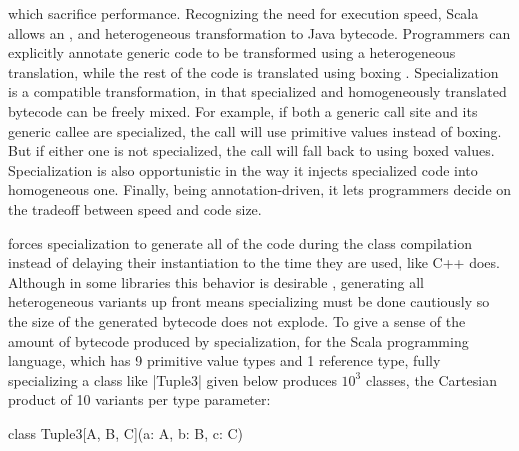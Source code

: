  which sacrifice performance. Recognizing the need for execution speed, Scala  \cite{iuli-thesis} allows an ,  and  heterogeneous transformation to Java bytecode. Programmers can explicitly annotate generic code to be transformed using a heterogeneous translation, while the rest of the code is translated using boxing \cite{java-erasure}. Specialization is a compatible transformation, in that specialized and homogeneously translated bytecode can be freely mixed. For example, if both a generic call site and its generic callee are specialized, the call will use primitive values instead of boxing. But if either one is not specialized, the call will fall back to using boxed values. Specialization is also opportunistic in the way it injects specialized code into homogeneous one. Finally, being annotation-driven, it lets programmers decide on the tradeoff between speed and code size.

 forces specialization to generate all  of the code during the class compilation instead of delaying their instantiation to the time they are used, like C++ does. Although in some libraries this behavior is desirable \cite{gil-adobe}, generating all heterogeneous variants up front means specializing must be done cautiously so the size of the generated bytecode does not explode. To give a sense of the amount of bytecode produced by specialization, for the Scala programming language, which has 9 primitive value types and 1 reference type, fully specializing a class like |Tuple3| given below produces $10^3$ classes, the Cartesian product of 10 variants per type parameter:

\begin{lstlisting-nobreak}
 class Tuple3[A, B, C](a: A, b: B, c: C)
\end{lstlisting-nobreak}

